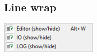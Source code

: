 %
%
%
%
%


\hypertarget{menu_view_linewrap}{}
\subsection{Line wrap}

\includegraphics[scale=0.8]{./res/menu_view_linewrap.png}\\

